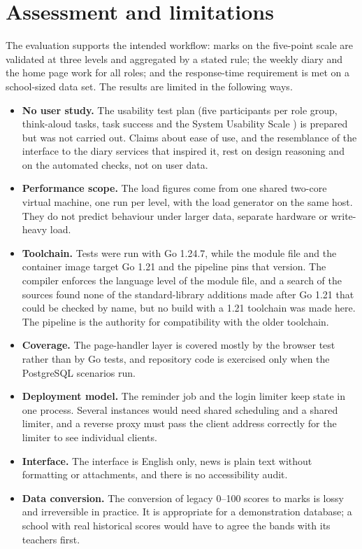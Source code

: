 \section{Assessment and limitations}
\label{sec:limits}

The evaluation supports the intended workflow: marks on the five-point scale are validated at three levels and aggregated by a stated rule; the weekly diary and the home page work for all roles; and the response-time requirement is met on a school-sized data set. The results are limited in the following ways.

\begin{itemize}
  \item \textbf{No user study.} The usability test plan (five participants per role group, think-aloud tasks, task success and the System Usability Scale \cite{sus}) is prepared but was not carried out. Claims about ease of use, and the resemblance of the interface to the diary services that inspired it, rest on design reasoning and on the automated checks, not on user data.
  \item \textbf{Performance scope.} The load figures come from one shared two-core virtual machine, one run per level, with the load generator on the same host. They do not predict behaviour under larger data, separate hardware or write-heavy load.
  \item \textbf{Toolchain.} Tests were run with Go 1.24.7, while the module file and the container image target Go 1.21 and the pipeline pins that version. The compiler enforces the language level of the module file, and a search of the sources found none of the standard-library additions made after Go 1.21 that could be checked by name, but no build with a 1.21 toolchain was made here. The pipeline is the authority for compatibility with the older toolchain.
  \item \textbf{Coverage.} The page-handler layer is covered mostly by the browser test rather than by Go tests, and repository code is exercised only when the PostgreSQL scenarios run.
  \item \textbf{Deployment model.} The reminder job and the login limiter keep state in one process. Several instances would need shared scheduling and a shared limiter, and a reverse proxy must pass the client address correctly for the limiter to see individual clients.
  \item \textbf{Interface.} The interface is English only, news is plain text without formatting or attachments, and there is no accessibility audit.
  \item \textbf{Data conversion.} The conversion of legacy 0--100 scores to marks is lossy and irreversible in practice. It is appropriate for a demonstration database; a school with real historical scores would have to agree the bands with its teachers first.
\end{itemize}
